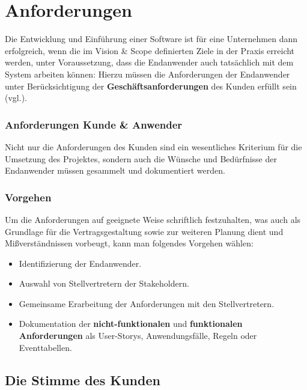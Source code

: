 \section{Anforderungen}\label{sec:anforderungen}

\vspace{5mm}
\begin{tcolorbox}
    Die Entwicklung und Einführung einer Software ist für eine Unternehmen dann erfolgreich, wenn die im Vision \& Scope definierten Ziele in der Praxis erreicht werden, unter Voraussetzung, dass die Endanwender auch tatsächlich mit dem System arbeiten können: Hierzu müssen die Anforderungen der Endanwender unter Berücksichtigung der \textbf{Geschäftsanforderungen} des Kunden erfüllt sein (vgl.\cite[54]{Wed09}).
\end{tcolorbox}
\vspace{5mm}

\subsubsection*{Anforderungen Kunde \& Anwender}
Nicht nur die Anforderungen des Kunden sind ein wesentliches Kriterium für die Umsetzung des Projektes, sondern auch die Wünsche und Bedürfnisse der Endanwender müssen gesammelt und dokumentiert werden.\\

\subsubsection*{Vorgehen}
Um die Anforderungen auf geeignete Weise schriftlich festzuhalten, was auch als Grundlage für die Vertragsgestaltung sowie zur weiteren Planung dient und Mißverständnissen vorbeugt, kann man folgendes Vorgehen wählen:

\begin{itemize}
    \item Identifizierung der Endanwender.
    \item Auswahl von Stellvertretern der Stakeholdern.
    \item Gemeinsame Erarbeitung der Anforderungen mit den Stellvertretern.
    \item Dokumentation der \textbf{nicht-funktionalen} und \textbf{funktionalen Anforderungen} als User-Storys, Anwendungsfälle, Regeln oder Eventtabellen.
\end{itemize}


\subsection{Die Stimme des Kunden}
